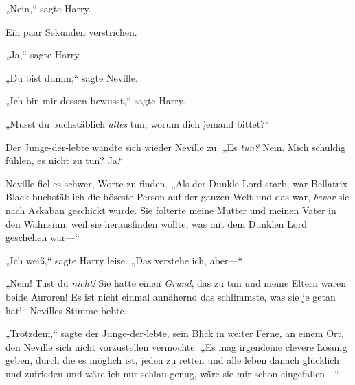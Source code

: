 „Nein,“ sagte Harry.

Ein paar Sekunden verstrichen.

„Ja,“ sagte Harry.

„Du bist dumm,“ sagte Neville.

„Ich bin mir dessen bewusst,“ sagte Harry.

„Musst du buchstäblich \emph{alles} tun, worum dich jemand bittet?“

Der Junge-der-lebte wandte sich wieder Neville zu. „Es \emph{tun?} Nein. Mich schuldig fühlen, es nicht zu tun? Ja.“

Neville fiel es schwer, Worte zu finden. „Als der Dunkle Lord starb, war Bellatrix Black buchstäblich die böseste Person auf der ganzen Welt und das war, \emph{bevor} sie nach Askaban geschickt wurde. Sie folterte meine Mutter und meinen Vater in den Wahnsinn, weil sie herausfinden wollte, was mit dem Dunklen Lord geschehen war—“

„Ich weiß,“ sagte Harry leise. „Das verstehe ich, aber—“

„Nein! Tust du \emph{nicht!} Sie hatte einen \emph{Grund}, das zu tun und meine Eltern waren beide Auroren! Es ist nicht einmal annähernd das schlimmste, was sie je getan hat!“ Nevilles Stimme bebte.

„Trotzdem,“ sagte der Junge-der-lebte, sein Blick in weiter Ferne, an einem Ort, den Neville sich nicht vorzustellen vermochte. „Es mag irgendeine clevere Lösung geben, durch die es möglich ist, jeden zu retten und alle leben danach glücklich und zufrieden und wäre ich nur schlau genug, wäre sie mir schon eingefallen—“

